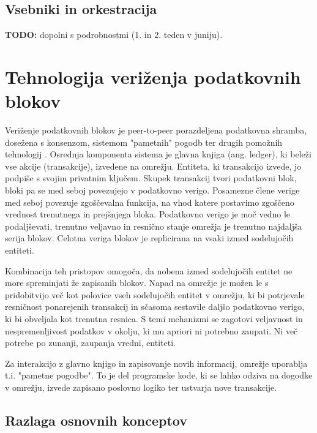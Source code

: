 \documentclass[a4paper, 12pt]{book}
\begin{document}
\section{Vsebniki in orkestracija}

\textbf{TODO:} dopolni s podrobnostmi (1. in 2. teden v juniju).


 \chapter{Tehnologija veriženja podatkovnih blokov}
\label{ch2}

Veriženje podatkovnih blokov je peer-to-peer porazdeljena podatkovna shramba, dosežena s konsenzom, sistemom "pametnih" pogodb ter drugih pomožnih tehnologij \cite{hyperledgerWeb}. Osrednja komponenta sistema je glavna knjiga (ang. ledger), ki beleži vse akcije (transakcije), izvedene na omrežju. \cite{hyperledgerDocs}
Entiteta, ki transakcijo izvede, jo podpiše s svojim privatnim ključem.
Skupek transakcij tvori podatkovni blok, bloki pa se med seboj povezujejo v podatkovno verigo.
Posamezne člene verige med seboj povezuje zgoščevalna funkcija, na vhod katere postavimo zgoščeno vrednost trenutnega in prejšnjega bloka.
Podatkovno verigo je moč vedno le podaljševati, trenutno veljavno in resnično stanje omrežja je trenutno najdaljša serija blokov.
Celotna veriga blokov je replicirana na vsaki izmed sodelujočih entiteti.

Kombinacija teh pristopov omogoča, da nobena izmed sodelujočih entitet ne more spreminjati že zapisanih blokov.
Napad na omrežje je možen le s pridobitvijo več kot polovice vseh sodelujočih entitet v omrežju, ki bi potrjevale resničnost ponarejenih transakcij in sčasoma sestavile daljšo podatkovno verigo, ki bi obveljala kot trenutna resnica.
S temi mehanizmi se zagotovi veljavnost in nespremenljivost podatkov v okolju, ki mu apriori ni potrebno zaupati.
Ni več potrebe po zunanji, zaupanja vredni, entiteti.

Za interakcijo z glavno knjigo in zapisovanje novih informacij, omrežje uporablja t.i. "pametne pogodbe". \cite{hyperledgerDocs}
To je del programske kode, ki se lahko odziva na dogodke v omrežju, izvede zapisano poslovno logiko ter ustvarja nove transakcije.\\

\section{Razlaga osnovnih konceptov}
\end{document}
